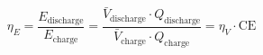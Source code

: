 \documentclass[preview]{standalone}
\begin{document}
\[\eta_E = \frac{E_\text{discharge}}{E_\text{charge}} = \frac{\bar{V}_\text{discharge} \cdot Q_\text{discharge}}{\bar{V}_\text{charge} \cdot Q_\text{charge}} = \eta_V \cdot \text{CE} \tag{3.15}\]
\end{document}
